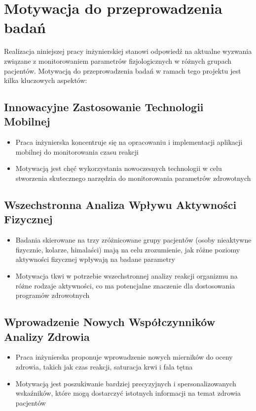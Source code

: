 \section{Motywacja do przeprowadzenia badań}
Realizacja niniejszej pracy inżynierskiej stanowi odpowiedź na aktualne wyzwania związane z monitorowaniem parametrów fizjologicznych w różnych grupach pacjentów. Motywacją do przeprowadzenia badań w ramach tego projektu jest kilka kluczowych aspektów:
\subsection{Innowacyjne Zastosowanie Technologii Mobilnej}
\begin{itemize}
    \item Praca inżynierska koncentruje się na opracowaniu i implementacji aplikacji mobilnej do monitorowania czasu reakcji
    \item Motywacją jest chęć wykorzystania nowoczesnych technologii w celu stworzenia skutecznego narzędzia do monitorowania parametrów zdrowotnych
\end{itemize}
\subsection{Wszechstronna Analiza Wpływu Aktywności Fizycznej}
\begin{itemize}
    \item Badania skierowane na trzy zróżnicowane grupy pacjentów (osoby nieaktywne fizycznie, kolarze, himalaści) mają na celu zrozumienie, jak różne poziomy aktywności fizycznej wpływają na badane parametry
    \item Motywacja tkwi w potrzebie wszechstronnej analizy reakcji organizmu na różne rodzaje aktywności, co ma potencjalne znaczenie dla dostosowania programów zdrowotnych
\end{itemize}
\subsection{Wprowadzenie Nowych Współczynników Analizy Zdrowia}
\begin{itemize}
    \item Praca inżynierska proponuje wprowadzenie nowych mierników do oceny zdrowia, takich jak czas reakcji, saturacja krwi i fala tętna
    \item Motywacją jest poszukiwanie bardziej precyzyjnych i spersonalizowanych wskaźników, które mogą dostarczyć istotnych informacji na temat zdrowia pacjentów
\end{itemize}

